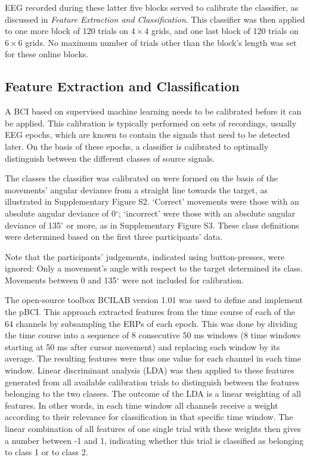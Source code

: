 EEG recorded during these latter five blocks served to calibrate the classifier, as discussed in \emph{Feature Extraction and Classification}. This classifier was then applied to one more block of 120 trials on $4\times4$ grids, and one last block of 120 trials on $6\times6$ grids. No maximum number of trials other than the block's length was set for these online blocks. 


\subsection*{Feature Extraction and Classification}

A BCI based on supervised machine learning needs to be calibrated before it can be applied. This calibration is typically performed on sets of recordings, usually EEG epochs, which are known to contain the signals that need to be detected later. On the basis of these epochs, a classifier is calibrated to optimally distinguish between the different classes of source signals.

The classes the classifier was calibrated on were formed on the basis of the movements' angular deviance from a straight line towards the target, as illustrated in Supplementary Figure S2. `Correct' movements were those with an absolute angular deviance of 0$^\circ$; `incorrect' were those with an absolute angular deviance of 135$^\circ$ or more, as in Supplementary Figure S3. These class definitions were determined based on the first three participants' data.

Note that the participants' judgements, indicated using button-presses, were ignored: Only a movement's angle with respect to the target determined its class. Movements between 0 and 135$^\circ$ were not included for calibration.

The open-source toolbox BCILAB \cite{kothe2013bcilab} version 1.01 was used to define and implement the pBCI. This approach extracted features from the time course of each of the 64 channels by subsampling the ERPs of each epoch. This was done by dividing the time course into a sequence of 8 consecutive 50 ms windows (8 time windows starting at 50 ms after cursor movement) and replacing each window by its average. The resulting features were thus one value for each channel in each time window. Linear discriminant analysis (LDA) was then applied to these features generated from all available calibration trials to distinguish between the features belonging to the two classes. The outcome of the LDA is a linear weighting of all features. In other words, in each time window all channels receive a weight according to their relevance for classification in that specific time window. The linear combination of all features of one single trial with these weights then gives a number between -1 and 1, indicating whether this trial is classified as belonging to class 1 or to class 2.

